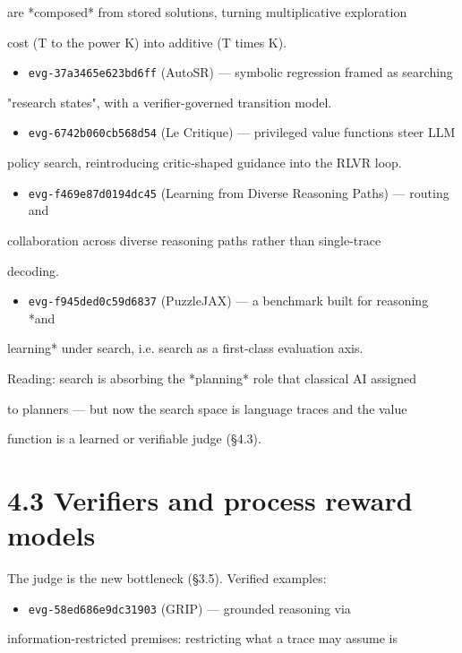 \documentclass[11pt]{article}
\begin{document}
are *composed* from stored solutions, turning multiplicative exploration

cost (T to the power K) into additive (T times K).

\begin{itemize}
\item \texttt{evg-37a3465e623bd6ff} (AutoSR) --- symbolic regression framed as searching
\end{itemize}
"research states", with a verifier-governed transition model.

\begin{itemize}
\item \texttt{evg-6742b060cb568d54} (Le Critique) --- privileged value functions steer LLM
\end{itemize}
policy search, reintroducing critic-shaped guidance into the RLVR loop.

\begin{itemize}
\item \texttt{evg-f469e87d0194dc45} (Learning from Diverse Reasoning Paths) --- routing and
\end{itemize}
collaboration across diverse reasoning paths rather than single-trace

decoding.

\begin{itemize}
\item \texttt{evg-f945ded0c59d6837} (PuzzleJAX) --- a benchmark built for reasoning *and
\end{itemize}
learning* under search, i.e. search as a first-class evaluation axis.


Reading: search is absorbing the *planning* role that classical AI assigned

to planners --- but now the search space is language traces and the value

function is a learned or verifiable judge (\S4.3).


\section{4.3 Verifiers and process reward models}

The judge is the new bottleneck (\S3.5). Verified examples:


\begin{itemize}
\item \texttt{evg-58ed686e9dc31903} (GRIP) --- grounded reasoning via
\end{itemize}
information-restricted premises: restricting what a trace may assume is
\end{document}
